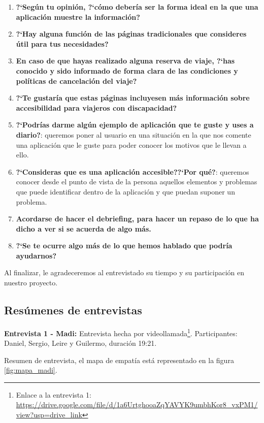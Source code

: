 \begin{enumerate}
    \item {\textbf{?`Según tu opinión, ?`cómo debería ser la forma ideal en la que una aplicación muestre la información?}}
    \item {\textbf{?`Hay alguna función de las páginas tradicionales que consideres útil para tus necesidades?}}
    \item {\textbf{En caso de que hayas realizado alguna reserva de viaje, ?`has conocido y sido informado de forma clara de las condiciones
                        y políticas de cancelación del viaje?}}
    \item {\textbf{?`Te gustaría que estas páginas incluyesen más información sobre accesibilidad para viajeros con discapacidad?}}
    \item {\textbf{?`Podrías darme algún ejemplo de aplicación que te guste y uses a diario?}}: queremos poner al usuario en una situación
    en la que nos comente una aplicación que le guste para poder conocer los motivos que le llevan a ello.
    \item {\textbf{?`Consideras que es una aplicación accesible??`Por qué?}}: queremos conocer desde el punto de vista de la persona aquellos
    elementos y problemas que puede identificar dentro de la aplicación y que puedan suponer un problema.
    \item {\textbf{Acordarse de hacer el debriefing, para hacer un repaso de lo que ha dicho a ver si se acuerda de algo más.}}
    \item {\textbf{?`Se te ocurre algo más de lo que hemos hablado que podría ayudarnos?}}
\end{enumerate}

Al finalizar, le agradeceremos al entrevistado su tiempo y su participación en nuestro proyecto.


\subsection{Resúmenes de entrevistas}

\textbf{Entrevista 1 - Madi:} Entrevista hecha por videollamada\footnote{Enlace a la entrevista 1: \url{https://drive.google.com/file/d/1a6UrtghooaZqYAVYK9umbhKor8_vxPM1/view?usp=drive_link}}. Participantes: Daniel, Sergio, Leire y Guilermo, duración 19:21.

Resumen de entrevista, el mapa de empatía está representado en la figura \ref{fig:mapa_madi}.

